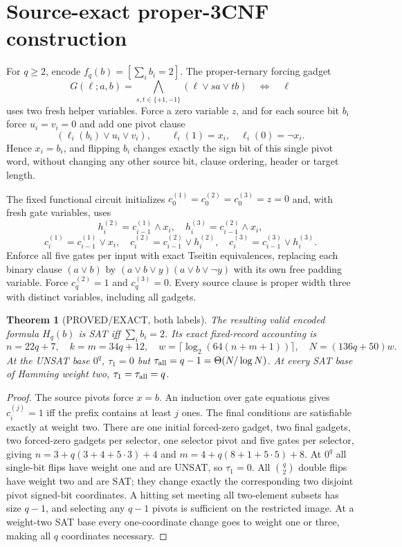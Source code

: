 \documentclass[10pt]{article}
\newtheorem{theorem}{Theorem}
\begin{document}
\section{Source-exact proper-3CNF construction}
For $q\ge2$, encode $f_q(b)=[\sum_i b_i=2]$. The proper-ternary forcing gadget
\[
G(\ell;a,b)=\bigwedge_{s,t\in\{+1,-1\}}(\ell\lor sa\lor tb)
\quad\Longleftrightarrow\quad\ell
\]
uses two fresh helper variables. Force a zero variable $z$, and for each source bit $b_i$ force $u_i=v_i=0$ and add one pivot clause
\[
(\ell_i(b_i)\lor u_i\lor v_i),\qquad
\ell_i(1)=x_i,\quad\ell_i(0)=\neg x_i.
\]
Hence $x_i=b_i$, and flipping $b_i$ changes exactly the sign bit of this single pivot word, without changing any other source bit, clause ordering, header or target length.

The fixed functional circuit initializes $c_0^{(1)}=c_0^{(2)}=c_0^{(3)}=z=0$ and, with fresh gate variables, uses
\[
h_i^{(2)}=c_{i-1}^{(1)}\wedge x_i,\quad h_i^{(3)}=c_{i-1}^{(2)}\wedge x_i,
\]
\[
c_i^{(1)}=c_{i-1}^{(1)}\vee x_i,\quad
c_i^{(2)}=c_{i-1}^{(2)}\vee h_i^{(2)},\quad
c_i^{(3)}=c_{i-1}^{(3)}\vee h_i^{(3)}.
\]
Enforce all five gates per input with exact Tseitin equivalences, replacing each binary clause $(a\lor b)$ by $(a\lor b\lor y)(a\lor b\lor\neg y)$ with its own free padding variable. Force $c_q^{(2)}=1$ and $c_q^{(3)}=0$. Every source clause is proper width three with distinct variables, including all gadgets.
\begin{theorem}[PROVED/EXACT, both labels]
The resulting valid encoded formula $H_q(b)$ is SAT iff $\sum_i b_i=2$. Its exact fixed-record accounting is
\[
n=22q+7,\quad k=m=34q+12,\quad
w=\lceil\log_2(64(n+m+1))\rceil,\quad N=(136q+50)w.
\]
At the UNSAT base $0^q$, $\tau_1=0$ but $\tau_{\rm all}=q-1=\Theta(N/\log N)$. At every SAT base of Hamming weight two, $\tau_1=\tau_{\rm all}=q$.
\end{theorem}
\begin{proof}
The source pivots force $x=b$. An induction over gate equations gives $c_i^{(j)}=1$ iff the prefix contains at least $j$ ones. The final conditions are satisfiable exactly at weight two. There are one initial forced-zero gadget, two final gadgets, two forced-zero gadgets per selector, one selector pivot and five gates per selector, giving $n=3+q(3+4+5\cdot3)+4$ and $m=4+q(8+1+5\cdot5)+8$.
At $0^q$ all single-bit flips have weight one and are UNSAT, so $\tau_1=0$. All $\binom q2$ double flips have weight two and are SAT; they change exactly the corresponding two disjoint pivot signed-bit coordinates. A hitting set meeting all two-element subsets has size $q-1$, and selecting any $q-1$ pivots is sufficient on the restricted image. At a weight-two SAT base every one-coordinate change goes to weight one or three, making all $q$ coordinates necessary.
\end{proof}
\end{document}
